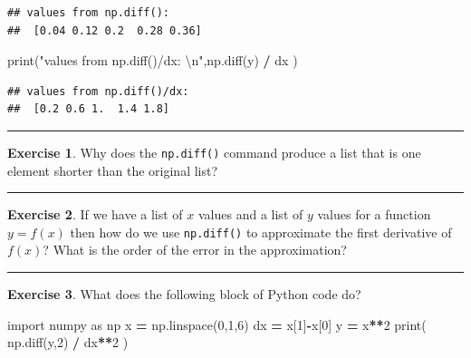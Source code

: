 \documentclass[
]{book}
\newenvironment{Shaded}{\begin{snugshade}}{\end{snugshade}}
\newcommand{\BuiltInTok}[1]{#1}
\newcommand{\CharTok}[1]{\textcolor[rgb]{0.31,0.60,0.02}{#1}}
\newcommand{\DecValTok}[1]{\textcolor[rgb]{0.00,0.00,0.81}{#1}}
\newcommand{\ImportTok}[1]{#1}
\newcommand{\NormalTok}[1]{#1}
\newcommand{\OperatorTok}[1]{\textcolor[rgb]{0.81,0.36,0.00}{\textbf{#1}}}
\newcommand{\StringTok}[1]{\textcolor[rgb]{0.31,0.60,0.02}{#1}}
\theoremstyle{definition}
\theoremstyle{definition}
\theoremstyle{definition}
\newtheorem{exercise}{Exercise}[chapter]
\theoremstyle{remark}
\begin{document}
\begin{verbatim}
## values from np.diff(): 
##  [0.04 0.12 0.2  0.28 0.36]
\end{verbatim}

\begin{Shaded}
\begin{Highlighting}[]
\BuiltInTok{print}\NormalTok{(}\StringTok{"values from np.diff()/dx: }\CharTok{\textbackslash{}n}\StringTok{"}\NormalTok{,np.diff(y) }\OperatorTok{/}\NormalTok{ dx )}
\end{Highlighting}
\end{Shaded}

\begin{verbatim}
## values from np.diff()/dx: 
##  [0.2 0.6 1.  1.4 1.8]
\end{verbatim}

\begin{center}\rule{0.5\linewidth}{0.5pt}\end{center}

\begin{exercise}
\protect\hypertarget{exr:unnamed-chunk-215}{}{\label{exr:unnamed-chunk-215} }Why does the \texttt{np.diff()} command produce a list that is one element shorter than the original list?
\end{exercise}

\begin{center}\rule{0.5\linewidth}{0.5pt}\end{center}

\begin{exercise}
\protect\hypertarget{exr:unnamed-chunk-216}{}{\label{exr:unnamed-chunk-216} }If we have a list of \(x\) values and a list of \(y\) values for a function \(y=f(x)\) then how do we use \texttt{np.diff()} to approximate the first derivative of \(f(x)\)? What is the order of the error in the approximation?
\end{exercise}

\begin{center}\rule{0.5\linewidth}{0.5pt}\end{center}

\begin{exercise}
\protect\hypertarget{exr:unnamed-chunk-217}{}{\label{exr:unnamed-chunk-217} }What does the following block of Python code do?
\end{exercise}

\begin{Shaded}
\begin{Highlighting}[]
\ImportTok{import}\NormalTok{ numpy }\ImportTok{as}\NormalTok{ np}
\NormalTok{x }\OperatorTok{=}\NormalTok{ np.linspace(}\DecValTok{0}\NormalTok{,}\DecValTok{1}\NormalTok{,}\DecValTok{6}\NormalTok{)}
\NormalTok{dx }\OperatorTok{=}\NormalTok{ x[}\DecValTok{1}\NormalTok{]}\OperatorTok{{-}}\NormalTok{x[}\DecValTok{0}\NormalTok{]}
\NormalTok{y }\OperatorTok{=}\NormalTok{ x}\OperatorTok{**}\DecValTok{2}
\BuiltInTok{print}\NormalTok{( np.diff(y,}\DecValTok{2}\NormalTok{) }\OperatorTok{/}\NormalTok{ dx}\OperatorTok{**}\DecValTok{2}\NormalTok{ )}
\end{Highlighting}
\end{Shaded}
\end{document}
